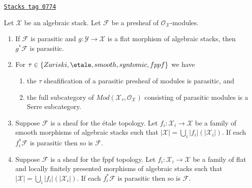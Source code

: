 \begin{lemma}[Parasitic]
\label{stacks-cohomology-lemma-parasitic}
\href{https://stacks.math.columbia.edu/tag/0774}{\texttt{Stacks tag 0774}}

Let $\mathcal{X}$ be an algebraic stack. Let $\mathcal{F}$
be a presheaf of $\mathcal{O}_\mathcal{X}$-modules.
\begin{enumerate}
\item If $\mathcal{F}$ is parasitic and
$g : \mathcal{Y} \to \mathcal{X}$ is a flat morphism of algebraic stacks,
then $g^*\mathcal{F}$ is parasitic.
\item For $\tau \in \{Zariski, \etale, smooth, syntomic, fppf\}$
we have
\begin{enumerate}
\item the $\tau$ sheafification of a parasitic presheaf of modules is
parasitic, and
\item the full subcategory of
$\textit{Mod}(\mathcal{X}_\tau, \mathcal{O}_\mathcal{X})$
consisting of parasitic modules is a Serre subcategory.
\end{enumerate}
\item Suppose $\mathcal{F}$ is a sheaf for the \'etale topology.
Let $f_i : \mathcal{X}_i \to \mathcal{X}$ be a family of
smooth morphisms of algebraic stacks such that
$|\mathcal{X}| = \bigcup_i |f_i|(|\mathcal{X}_i|)$. If each
$f_i^*\mathcal{F}$ is parasitic then so is $\mathcal{F}$.
\item Suppose $\mathcal{F}$ is a sheaf for the fppf topology.
Let $f_i : \mathcal{X}_i \to \mathcal{X}$ be a family of
flat and locally finitely presented morphisms of algebraic stacks such that
$|\mathcal{X}| = \bigcup_i |f_i|(|\mathcal{X}_i|)$. If each
$f_i^*\mathcal{F}$ is parasitic then so is $\mathcal{F}$.
\end{enumerate}
\end{lemma}

